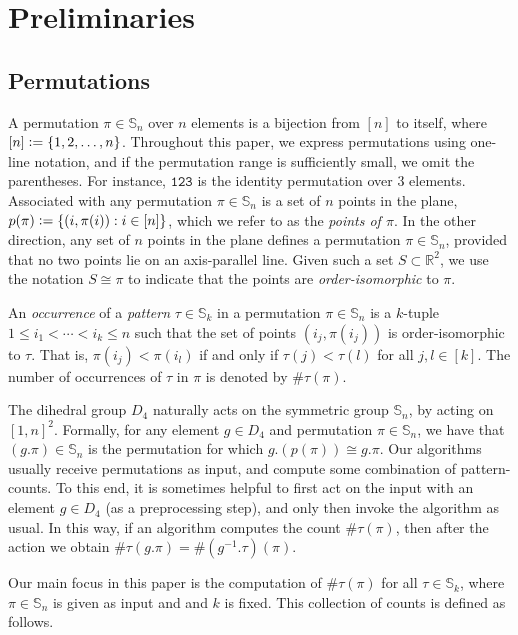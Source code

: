 \documentclass{article}
\newcommand{\Sn}{\mathbb{S}_n}
\newcommand{\pc}[2]{{\# \mathtt{ #1 } \left( #2 \right)}}
\newcommand{\pcn}[2]{{\# #1 } \left( #2 \right)}
\newcommand{\eqdef}{\vcentcolon=}
\theoremstyle{remark}
\theoremstyle{plain}
\begin{document}
 \section{Preliminaries}
\label{sect:prelims}
\subsection{Permutations}

A permutation $\pi \in \mathbb{S}_n$ over $n$ elements is a bijection from $[n]$ to itself, where $[n] \eqdef \{1, 2, \dots, n\}$. Throughout this paper, we express permutations using one-line notation, and if the permutation range is sufficiently small, we omit the parentheses. For instance, $\mathtt{123}$ is the identity permutation over $3$ elements. Associated with any permutation $\pi \in \Sn$ is a set of $n$ points in the plane, $p(\pi) \eqdef \{ (i, \pi(i)) : i \in [n]\}$, which we refer to as the \emph{points of $\pi$}. In the other direction, any set of $n$ points in the plane defines a permutation $\pi \in \Sn$, provided that no two points lie on an axis-parallel line. Given such a set $S \subset \mathbb{R}^2$, we use the notation $S \cong \pi$ to indicate that the points are \emph{order-isomorphic} to $\pi$.

An \emph{occurrence} of a \emph{pattern} $\tau \in \mathbb{S}_k$ in a permutation $\pi \in \Sn$ is a $k$-tuple  $1\le i_1 < \cdots< i_k \le n$ such that the set of points $(i_j,\pi(i_j))$ is order-isomorphic to $\tau$. That is, $\pi(i_j) < \pi(i_l)$ if and only if $\tau(j)<\tau(l)$ for all $j,l\in[k]$. The number of occurrences of $\tau$ in $\pi$ is denoted by $\pc{\tau}{\pi}$.

The dihedral group $D_4$ naturally acts on the symmetric group $\Sn$,
by acting on $[1, n]^2$. Formally, for any element $g \in D_4$ and 
permutation $\pi \in \Sn$, we have that $(g. \pi) \in \Sn$ is the permutation 
for which $g. (p(\pi)) \cong g. \pi$. 
Our algorithms usually receive permutations as input, and compute some combination of pattern-counts.
To this end, it is sometimes helpful to first act on the input with an element $g \in D_4$  (as a preprocessing step),
and only then invoke the algorithm as usual.
In this way, if an algorithm computes the count $\pc{\tau}{\pi}$, then after the action we obtain
$\pcn{\tau}{g. \pi} = \pcn{(g^{-1}. \tau)}{\pi}$.

Our main focus in this paper is the computation of $\pc{\tau}{\pi}$ for all $\tau\in\mathbb{S}_k$, where $\pi\in\Sn$ is given as input and and $k$ is fixed. This collection of counts is defined as follows.
\end{document}
